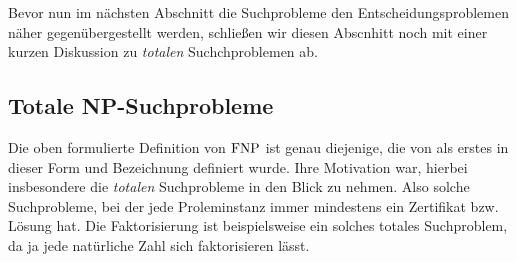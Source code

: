 Bevor nun im nächsten Abschnitt die Suchprobleme den Entscheidungsproblemen näher gegenübergestellt werden, schließen wir diesen Abscnhitt noch mit einer kurzen Diskussion zu \emph{totalen} Suchchproblemen ab.

\subsection*{Totale NP-Suchprobleme}

Die oben formulierte Definition von $\mathrm{FNP}$ ist genau diejenige, die von \textcite{megiddo_total_1991} als erstes in dieser Form und Bezeichnung definiert wurde. Ihre Motivation war, hierbei insbesondere die \emph{totalen} Suchprobleme in den Blick zu nehmen. Also solche Suchprobleme, bei der jede Proleminstanz immer mindestens ein Zertifikat bzw. Lösung hat. Die Faktorisierung ist beispielsweise ein solches totales Suchproblem, da ja jede natürliche Zahl sich faktorisieren lässt.

